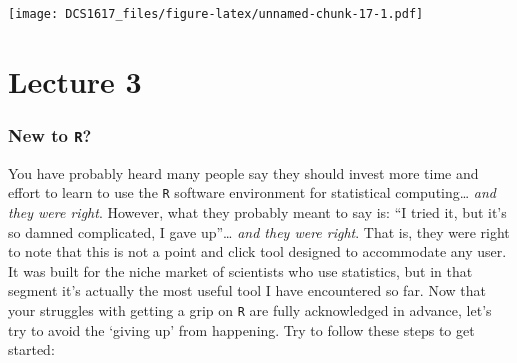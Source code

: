 \documentclass[]{book}
\begin{document}
\texttt{[image: DCS1617\_files/figure-latex/unnamed-chunk-17-1.pdf]}

\chapter*{Lecture 3}\label{lecture-3}

\subsection*{\texorpdfstring{New to
\texttt{R}?}{New to R?}}\label{new-to-r}

You have probably heard many people say they should invest more time and
effort to learn to use the \texttt{R} software environment for
statistical computing\ldots{} \emph{and they were right}. However, what
they probably meant to say is: ``I tried it, but it's so damned
complicated, I gave up''\ldots{} \emph{and they were right}. That is,
they were right to note that this is not a point and click tool designed
to accommodate any user. It was built for the niche market of scientists
who use statistics, but in that segment it's actually the most useful
tool I have encountered so far. Now that your struggles with getting a
grip on \texttt{R} are fully acknowledged in advance, let's try to avoid
the `giving up' from happening. Try to follow these steps to get
started:
\end{document}
